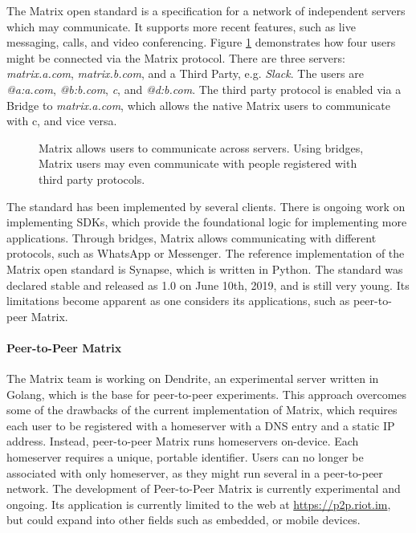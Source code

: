 The Matrix open standard\cite{matrix_org_spec} is a specification for a network of independent servers which may communicate.
It supports more recent features, such as live messaging, calls, and video conferencing.
Figure \ref{fig:matrix_structure} demonstrates how four users might be connected via the Matrix protocol.
There are three servers: \textit{matrix.a.com}, \textit{matrix.b.com}, and a Third Party, e.g. \textit{Slack}.
The users are \textit{@a:a.com}, \textit{@b:b.com}, \textit{c}, and \textit{@d:b.com}.
The third party protocol is enabled via a Bridge to \textit{matrix.a.com}, which allows the native Matrix users to communicate with c, and vice versa.

\begin{figure}
    \centering
    \resizebox{0.7\linewidth}{!}{}
    \caption{Matrix allows users to communicate across servers. Using bridges, Matrix users may even communicate with people registered with third party protocols.}
    \label{fig:matrix_structure}
\end{figure}

The standard has been implemented by several clients\cite{matrix_org_clients}.
There is ongoing work on implementing SDKs\cite{matrix_org_sdks}, which provide the foundational logic for implementing more applications.
Through bridges, Matrix allows communicating with different protocols\cite{matrix_org_bridges}, such as WhatsApp or Messenger.
The reference implementation of the Matrix open standard is Synapse\cite{matrix_org_synapse}, which is written in Python.
The standard was declared stable and released as 1.0 on June 10th, 2019\cite{matrix_org_spec}, and is still very young.
Its limitations become apparent as one considers its applications, such as peer-to-peer Matrix.


\paragraph{Peer-to-Peer Matrix}
The Matrix team is working on Dendrite\cite{matrix_org_dendrite}, an experimental server written in Golang, which is the base for peer-to-peer experiments.
This approach overcomes some of the drawbacks of the current implementation of Matrix, which requires each user to be registered with a homeserver with a DNS entry and a static IP address.
Instead, peer-to-peer Matrix runs homeservers on-device.
Each homeserver requires a unique, portable identifier.
Users can no longer be associated with only homeserver, as they might run several in a peer-to-peer network.
The development of Peer-to-Peer Matrix is currently experimental and ongoing.
Its application is currently limited to the web at \url{https://p2p.riot.im}, but could expand into other fields such as embedded, or mobile devices.


